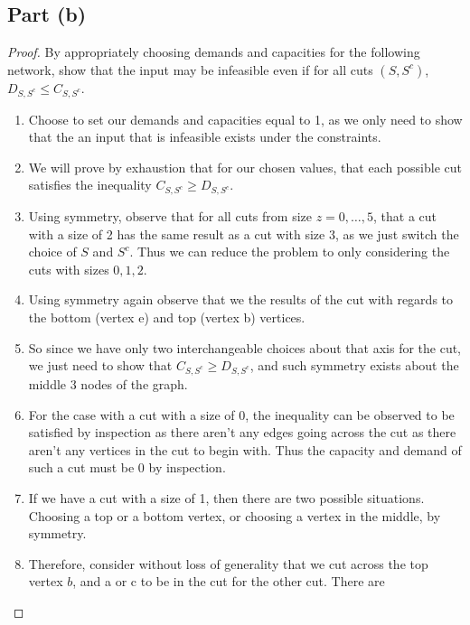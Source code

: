\documentclass{article}
\begin{document}
\subsection{Part (b)}
\begin{proof} By appropriately choosing demands and capacities
      for the following network, show that the input may be infeasible even if for all
      cuts \((S,S^c)\), \(D_{S,S^c} \leq C_{S,S^c}\).
      \begin{enumerate}
            \item Choose to set our demands and capacities equal to 1, as we only need to
                  show that the an input that is infeasible exists under the constraints.
            \item We will prove by exhaustion that for our chosen values, that each
                  possible cut satisfies the inequality \(C_{S,S^c} \geq D_{S,S^c}\).
            \item Using symmetry, observe that for all cuts from size \(z = 0, \ldots,
                  5\), that a cut with a size of 2 has the same result as a cut with size 3, as
                  we just switch the choice of \(S\) and \(S^c\). Thus we can reduce the problem
                  to only considering the cuts with sizes \(0,1,2\).
            \item Using symmetry again observe that we the results of the cut with regards
                  to the bottom (vertex e) and top (vertex b) vertices.
            \item So since we have only two interchangeable choices about that axis for the cut, we just
                  need to show that \(C_{S,S^c} \geq D_{S,S^c} \), and such symmetry exists
                  about the middle 3 nodes of the graph.
            \item For the case with a cut with a size of 0, the inequality can be observed
                  to be satisfied by inspection as there aren't any edges going across the cut
                  as there aren't any vertices in the cut to begin with. Thus the capacity and
                  demand of such a cut must be 0 by inspection.
            \item If we have a cut with a size of 1, then there are two possible
                  situations. Choosing a top or a bottom vertex, or choosing a vertex in the
                  middle, by symmetry.
            \item Therefore, consider without loss of generality that we cut across the
                  top vertex \(b\), and a or c to be in the cut for the other cut. There are

\end{enumerate}
\end{proof}
\end{document}

